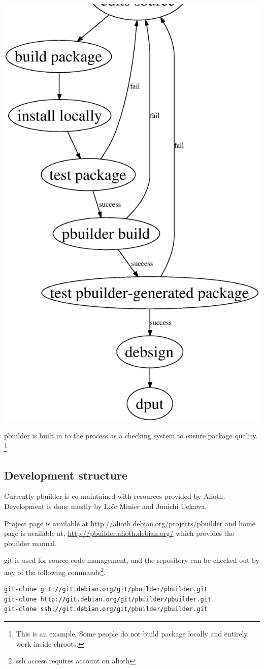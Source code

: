 \documentclass[a4paper]{article}
\begin{document}
\begin{center}
 \includegraphics[width=0.6\hsize]{develcycle.eps}
\end{center}

pbuilder is built in to the process as a checking system to ensure
package quality.  \footnote{This is an example. Some people do not build
package locally and entirely work inside chroots.}

\subsection{Development structure}

Currently pbuilder is co-maintained with resources provided by Alioth.
Development is done mostly by Lo\"ic Minier and Junichi Uekawa.

Project page is available at 
\url{http://alioth.debian.org/projects/pbuilder}
and home page is available at, 
\url{http://pbuilder.alioth.debian.org/}
which provides the pbuilder manual.

git is used for source code management, and the repository can be
checked out by any of the following commands\footnote{ssh access
requires account on alioth}.

\begin{verbatim}
git-clone git://git.debian.org/git/pbuilder/pbuilder.git
git-clone http://git.debian.org/git/pbuilder/pbuilder.git
git-clone ssh://git.debian.org/git/pbuilder/pbuilder.git
\end{verbatim}
\end{document}

